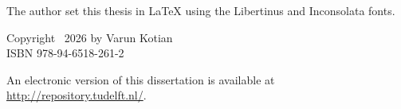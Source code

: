 \begin{titlepage}
\medskip
\medskip
\noindent The author set this thesis in \LaTeX\xspace using the Libertinus and Inconsolata fonts.

\vspace{\bigskipamount}



\noindent Copyright \faCopyright \ 2026 by Varun Kotian\\
\noindent ISBN 978-94-6518-261-2 

\medskip
\noindent An electronic version of this dissertation is available at \\
\url{http://repository.tudelft.nl/}.

\end{titlepage}

